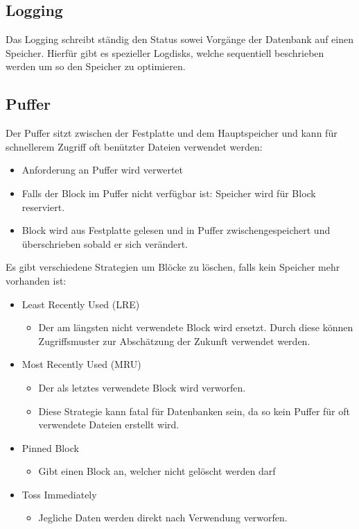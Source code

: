 \documentclass{article}
\begin{document}
	\subsection{Logging}
	Das Logging schreibt ständig den Status sowei Vorgänge der Datenbank auf einen Speicher. Hierfür gibt es spezieller Logdisks, welche sequentiell beschrieben werden um so den Speicher zu optimieren.
	\subsection{Puffer}
	Der Puffer sitzt zwischen der Festplatte und dem Hauptspeicher und kann für schnellerem Zugriff oft benützter Dateien verwendet werden:
	\begin{itemize}
		\item{Anforderung an Puffer wird verwertet}
		\item{Falls der Block im Puffer nicht verfügbar ist: Speicher wird für Block reserviert.}
		\item{Block wird aus Festplatte gelesen und in Puffer zwischengespeichert und überschrieben sobald er sich verändert.}
	\end{itemize}
	Es gibt verschiedene Strategien um Blöcke zu löschen, falls kein Speicher mehr vorhanden ist:
	\begin{itemize}
		\item{Least Recently Used (LRE)}
		\begin{itemize}
			\item{Der am längsten nicht verwendete Block wird ersetzt. Durch diese können Zugriffsmuster zur Abschätzung der Zukunft verwendet werden.}
		\end{itemize}
		\item{Most Recently Used (MRU)}
		\begin{itemize}
			\item{Der als letztes verwendete Block wird verworfen.}
			\item{Diese Strategie kann fatal für Datenbanken sein, da so kein Puffer für oft verwendete Dateien erstellt wird.}
		\end{itemize}
		\item{Pinned Block}
		\begin{itemize}
			\item{Gibt einen Block an, welcher nicht gelöscht werden darf}
		\end{itemize}
		\item{Toss Immediately}
		\begin{itemize}
			\item{Jegliche Daten werden direkt nach Verwendung verworfen.}
		\end{itemize}
	\end{itemize}
\end{document}
